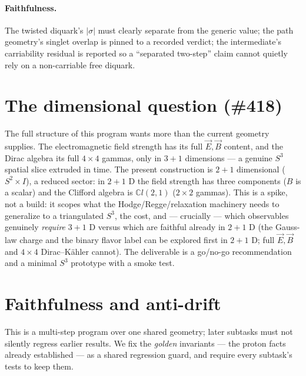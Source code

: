 \documentclass[11pt]{article}
\theoremstyle{definition}
\newcommand{\C}{\mathbb{C}}
\newcommand{\abs}[1]{\left\lvert #1 \right\rvert}
\newcommand{\sigmacol}{\sigma}
\begin{document}
\paragraph{Faithfulness.} The twisted diquark's $\abs{\sigmacol}$ must clearly separate
from the generic value; the path geometry's singlet overlap is pinned to a recorded
verdict; the intermediate's carriability residual is reported so a ``separated two-step''
claim cannot quietly rely on a non-carriable free diquark.

\section{The dimensional question (\#418)}
\label{sec:dim}

The full structure of this program wants more than the current geometry supplies. The
electromagnetic field strength has its full $\vec E,\vec B$ content, and the Dirac algebra
its full $4\times4$ gammas, only in $3+1$ dimensions --- a genuine $S^3$ spatial slice
extruded in time. The present construction is $2+1$ dimensional ($S^2\times I$), a reduced
sector: in $2+1$ D the field strength has three components ($B$ is a scalar) and the
Clifford algebra is $\C l(2,1)$ ($2\times2$ gammas). This is a spike, not a build: it
scopes what the Hodge/Regge/relaxation machinery needs to generalize to a triangulated
$S^3$, the cost, and --- crucially --- which observables genuinely \emph{require} $3+1$ D
versus which are faithful already in $2+1$ D (the Gauss-law charge and the binary flavor
label can be explored first in $2+1$ D; full $\vec E,\vec B$ and $4\times4$
Dirac--K\"ahler cannot). The deliverable is a go/no-go recommendation and a minimal $S^3$
prototype with a smoke test.

\section{Faithfulness and anti-drift}
\label{sec:faithful}

This is a multi-step program over one shared geometry; later subtasks must not silently
regress earlier results. We fix the \emph{golden} invariants --- the proton facts already
established --- as a shared regression guard, and require every subtask's tests to keep
them.
\end{document}
